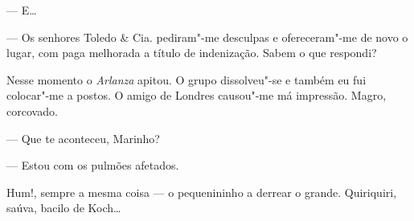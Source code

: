 --- E\ldots{}

--- Os senhores Toledo \& Cia. pediram"-me desculpas e ofereceram"-me de
novo o lugar, com paga melhorada a título de indenização. Sabem o que
respondi?


Nesse momento o \emph{Arlanza} apitou. O grupo dissolveu"-se e também eu
fui colocar"-me a postos. O amigo de Londres causou"-me má impressão.
Magro, corcovado.

--- Que te aconteceu, Marinho?

--- Estou com os pulmões afetados.

Hum!, sempre a mesma coisa --- o pequenininho a derrear o grande.
Quiriquiri, saúva, bacilo de Koch\ldots{}


